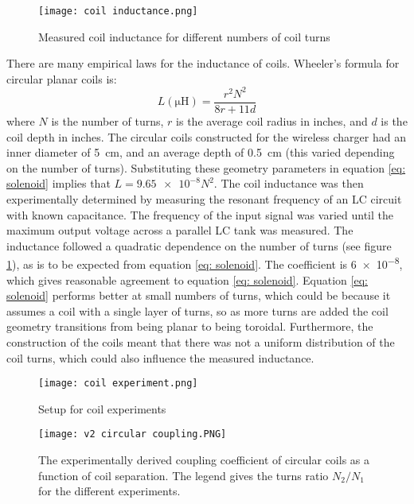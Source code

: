 \begin{figure}[htb]
	\centering
	\texttt{[image: coil inductance.png]}
	\caption{Measured coil inductance for different numbers of coil turns}
	\label{fig: coil inductance}
\end{figure}

There are many empirical laws for the inductance of coils. Wheeler's formula \cite{Wheeler} for circular planar coils is:
\begin{equation}\label{eq: solenoid}
L (\si{\micro\henry})= \frac{r^2N^2}{8r + 11d}
\end{equation}
where $N$ is the number of turns, $r$ is the average coil radius in inches, and $d$ is the coil depth in inches. The circular coils constructed for the wireless charger had an inner diameter of \SI{5}{\centi\metre}, and an average depth of \SI{0.5}{\centi\metre} (this varied depending on the number of turns). Substituting these geometry parameters in equation \ref{eq: solenoid} implies that $L=\num{9.65e-8}N^2$. The coil inductance was then experimentally determined by measuring the resonant frequency of an LC circuit with known capacitance. The frequency of the input signal was varied until the maximum output voltage across a parallel LC tank was measured. The inductance followed a quadratic dependence on the number of turns (see figure \ref{fig: coil inductance}), as is to be expected from equation \ref{eq: solenoid}. The coefficient is \num{6e-8}, which gives reasonable agreement to equation \ref{eq: solenoid}. Equation \ref{eq: solenoid} performs better at small numbers of turns, which could be because it assumes a coil with a single layer of turns, so as more turns are added the coil geometry transitions from being planar to being toroidal. Furthermore, the construction of the coils meant that there was not a uniform distribution of the coil turns, which could also influence the measured inductance.\\

\begin{figure}[htb]
	\centering
	\texttt{[image: coil experiment.png]}
	\caption{Setup for coil experiments}
	\label{fig: coil experiment setup}
\end{figure}
\begin{figure}[htb]
	\centering
	\texttt{[image: v2 circular coupling.PNG]}
	\caption{The experimentally derived coupling coefficient of circular coils as a function of coil separation. The legend gives the turns ratio $N_2/N_1$ for the different experiments.}
	\label{fig: circular coupling}
\end{figure}

